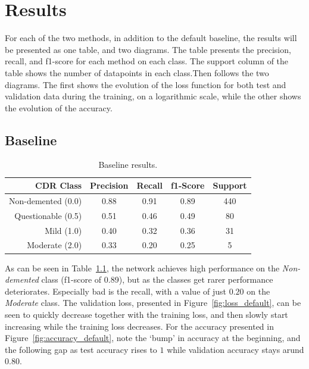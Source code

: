 \documentclass{kththesis}
\begin{document}
\chapter{Results}

For each of the two methods, in addition to the default baseline, the results will be presented as one table, and two diagrams. The table presents the precision, recall, and f1-score for each method on each class. The support column of the table shows the number of datapoints in each class.Then follows the two diagrams. The first shows the evolution of the loss function for both test and validation data during the training, on a logarithmic scale, while the other shows the evolution of the accuracy.

\section{Baseline}
\begin{table}[H]
  \begin{center}
    \caption{Baseline results. \label{tab:results_default}}
    \begin{tabular}{r|ccc|c}
      \textbf{CDR Class} & \textbf{Precision} & \textbf{Recall} & \textbf{f1-Score} & \textbf{Support} \\
      \toprule
      Non-demented (0.0) & 0.88 & 0.91 & 0.89 & 440 \\
      Questionable (0.5) & 0.51 & 0.46 & 0.49 & 80  \\
      Mild (1.0)         & 0.40 & 0.32 & 0.36 & 31  \\
      Moderate (2.0)     & 0.33 & 0.20 & 0.25 & 5   \\
    \end{tabular}
  \end{center}
\end{table}

As can be seen in Table~\ref{tab:results_default}, the network achieves high performance on the \textit{Non-demented} class (f1-score of 0.89), but as the classes get rarer performance deteriorates. Especially bad is the recall, with a value of just $0.20$ on the \textit{Moderate} class. The validation loss, presented in Figure~\ref{fig:loss_default}, can be seen to quickly decrease together with the training loss, and then slowly start increasing while the training loss decreases. For the accuracy presented in Figure~\ref{fig:accuracy_default}, note the `bump' in accuracy at the beginning, and the following gap as test accuracy rises to $1$ while validation accuracy stays arund $0.80$.
\end{document}
